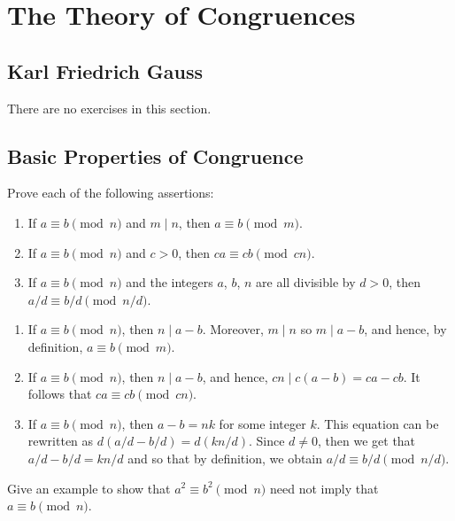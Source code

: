 \chapter{The Theory of Congruences}

\section{Karl Friedrich Gauss}

There are no exercises in this section.

\section{Basic Properties of Congruence}

\begin{exercise}
    Prove each of the following assertions:
    \begin{enumerate}
        \item If $a \equiv b \pmod n$ and $m \mid n$, then $a \equiv b \pmod m$.
        \item If $a \equiv b \pmod n$ and $c > 0$, then $ca \equiv cb \pmod{cn}$.
        \item If $a \equiv b \pmod n$ and the integers $a$, $b$, $n$ are all divisible by $d > 0$, then $a/d \equiv b/d \pmod{n/d}$.
    \end{enumerate}
\end{exercise}

\begin{solution}
    \begin{enumerate}
        \item If $a \equiv b \pmod n$, then $n \mid a - b$. Moreover, $m \mid n$ so $m \mid a - b$, and hence, by definition, $a \equiv b \pmod m$.
        \item If $a \equiv b \pmod n$, then $n \mid a - b$, and hence, $cn \mid c(a-b) = ca - cb$. It follows that $ca \equiv cb \pmod{cn}$.
        \item If $a \equiv b \pmod n$, then $a - b = nk$ for some integer $k$. This equation can be rewritten as $d(a/d - b/d) = d(kn/d)$. Since $d \neq 0$, then we get that $a/d - b/d = kn/d$ and so that by definition, we obtain $a/d \equiv b/d \pmod{n/d}$.
    \end{enumerate}
\end{solution}

\begin{exercise}
    Give an example to show that $a^2 \equiv b^2 \pmod n$ need not imply that $a \equiv b \pmod n$. \\
\end{exercise}

